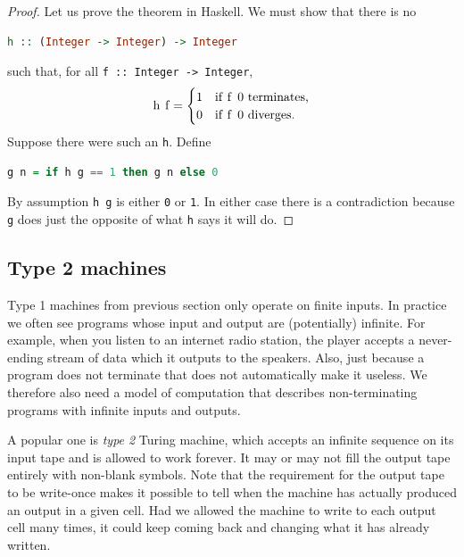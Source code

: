 \begin{proof}
  Let us prove the theorem in Haskell. We must show that there is no
  \begin{lstlisting}[language=Haskell]
h :: (Integer -> Integer) -> Integer
  \end{lstlisting}
  such that, for all \lstinline!f :: Integer -> Integer!,
  \begin{equation*}
    \text{\lstinline!h f!} =
    \begin{cases}
      \text{\lstinline!1!} & \text{if \lstinline!f 0! terminates,}\\
      \text{\lstinline!0!} & \text{if \lstinline!f 0! diverges.}
    \end{cases}
  \end{equation*}
  Suppose there were such an \lstinline!h!. Define
  \begin{lstlisting}[language=Haskell]
g n = if h g == 1 then g n else 0
  \end{lstlisting}
  By assumption \lstinline!h g! is either \lstinline!0! or
  \lstinline!1!. In either case there is a contradiction because
  \lstinline!g! does just the opposite of what \lstinline!h! says it
  will do.
\end{proof}


\subsection{Type 2 machines}
\label{sec:type-2}

Type 1 machines from previous section only operate on finite inputs.
In practice we often see programs whose input and output are
(potentially) infinite. For example, when you listen to an internet
radio station, the player accepts a never-ending stream of data which
it outputs to the speakers. Also, just because a program does not
terminate that does not automatically make it useless. We therefore
also need a model of computation that describes non-terminating
programs with infinite inputs and outputs.

A popular one is \emph{type 2} Turing machine, which accepts an
infinite sequence on its input tape and is allowed to work forever. It
may or may not fill the output tape entirely with non-blank symbols.
Note that the requirement for the output tape to be write-once makes
it possible to tell when the machine has actually produced an output
in a given cell. Had we allowed the machine to write to each output
cell many times, it could keep coming back and changing what it has
already written.

